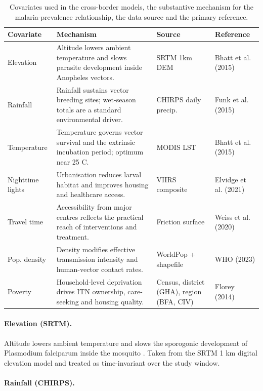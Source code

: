 \documentclass{article}
\begin{document}
\begingroup\fontsize{7}{9}\selectfont

\begin{longtable}[t]{l>{\raggedright\arraybackslash}p{5.5cm}ll}
\caption{\label{tab:covariates}Covariates used in the cross-border models, the substantive mechanism for the malaria-prevalence relationship, the data source and the primary reference. \label{tab:covariates}}\\
\toprule
Covariate & Mechanism & Source & Reference\\
\midrule
Elevation & Altitude lowers ambient temperature and slows parasite development inside Anopheles vectors. & SRTM 1km DEM & Bhatt et al. (2015)\\
Rainfall & Rainfall sustains vector breeding sites; wet-season totals are a standard environmental driver. & CHIRPS daily precip. & Funk et al. (2015)\\
Temperature & Temperature governs vector survival and the extrinsic incubation period; optimum near 25 C. & MODIS LST & Bhatt et al. (2015)\\
Nighttime lights & Urbanisation reduces larval habitat and improves housing and healthcare access. & VIIRS composite & Elvidge et al. (2021)\\
Travel time & Accessibility from major centres reflects the practical reach of interventions and treatment. & Friction surface & Weiss et al. (2020)\\
\addlinespace
Pop. density & Density modifies effective transmission intensity and human-vector contact rates. & WorldPop + shapefile & WHO (2023)\\
Poverty & Household-level deprivation drives ITN ownership, care-seeking and housing quality. & Census, district (GHA), region (BFA, CIV) & Florey (2014)\\
\bottomrule
\end{longtable}
\endgroup{}

\paragraph{Elevation (SRTM).}

Altitude lowers ambient temperature and slows the sporogonic development
of Plasmodium falciparum inside the mosquito
\citep{gething2011modelling, bhatt2015}. Taken from the SRTM 1 km
digital elevation model and treated as time-invariant over the study
window.

\paragraph{Rainfall (CHIRPS).}
\end{document}

